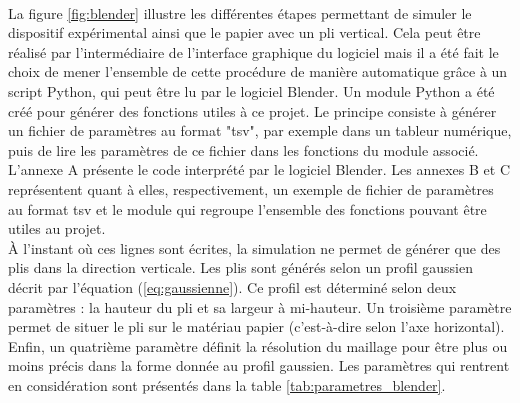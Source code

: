 \documentclass[a4paper, 11pt]{article}
\begin{document}
		\\La figure \ref{fig:blender} illustre les différentes étapes permettant de simuler le dispositif expérimental ainsi que le papier avec un pli vertical. Cela peut être réalisé par l'intermédiaire de l'interface graphique du logiciel mais il a été fait le choix de mener l'ensemble de cette procédure de manière automatique grâce à un script Python, qui peut être lu par le logiciel Blender. Un module Python a été créé pour générer des fonctions utiles à ce projet. Le principe consiste à générer un fichier de paramètres au format "tsv", par exemple dans un tableur numérique, puis de lire les paramètres de ce fichier dans les fonctions du module associé. L'annexe A présente le code interprété par le logiciel Blender. Les annexes B et C représentent quant à elles, respectivement, un exemple de fichier de paramètres au format tsv et le module qui regroupe l'ensemble des fonctions pouvant être utiles au projet.
		\\\`A l'instant où ces lignes sont écrites, la simulation ne permet de générer que des plis dans la direction verticale. Les plis sont générés selon un profil gaussien décrit par l'équation (\ref{eq:gaussienne}). Ce profil est déterminé selon deux paramètres : la hauteur du pli et sa largeur à mi-hauteur. Un troisième paramètre permet de situer le pli sur le matériau papier (c'est-à-dire selon l'axe horizontal). Enfin, un quatrième paramètre définit la résolution du maillage pour être plus ou moins précis dans la forme donnée au profil gaussien.
		Les paramètres qui rentrent en considération sont présentés dans la table \ref{tab:parametres_blender}.
\end{document}

